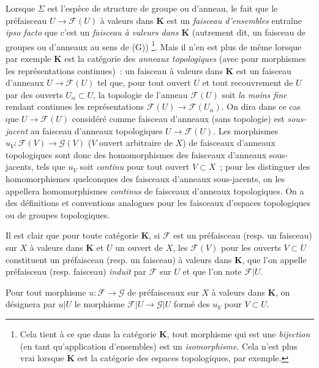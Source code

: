 \begin{env}[3.1.4]
\label{0.3.1.4-fr}
Lorsque $\Sigma$ est l'espèce de structure de groupe ou d'anneau, le fait que
le préfaisceau $U\to\mathcal{F}(U)$ à valeurs dans $\mathbf{K}$ est un
\emph{faisceau d'ensembles} entraîne \emph{ipso facto} que c'est un
\emph{faisceau à valeurs dans $\mathbf{K}$} (autrement dit, un faisceau de
groupes ou d'anneaux au sens de (G))%
\footnote{Cela tient à ce que dans la catégorie $\mathbf{K}$, tout morphisme
qui est une \emph{bijection} (en tant qu'application d'ensembles) est un
\emph{isomorphisme}. Cela n'est plus vrai lorsque $\mathbf{K}$ est la
catégorie des espaces topologiques, par exemple.}. Mais il n'en est plus de
même lorsque par exemple $\mathbf{K}$ est la catégorie des \emph{anneaux
topologiques} (avec pour morphismes les représentations continues)~: un
faisceau à valeurs dans $\mathbf{K}$ est un faisceau d'anneaux
$U\to\mathcal{F}(U)$ tel que, pour tout ouvert $U$ et tout recouvrement de $U$
par des ouverts $U_\alpha\subset U$, la topologie de l'anneau $\mathcal{F}(U)$
soit \emph{la moins fine} rendant continues les représentations
$\mathcal{F}(U)\to\mathcal{F}(U_\alpha)$. On dira dans ce cas que
$U\to\mathcal{F}(U)$ considéré comme faisceau d'anneaux (sans topologie) est
\emph{sous-jacent} au faisceau d'anneaux topologiques
$U\to\mathcal{F}(U)$. Les morphismes
$u_V:\mathcal{F}(V)\to\mathcal{G}(V)$ ($V$ ouvert arbitraire de $X$) de
faisceaux d'anneaux topologiques sont donc des homomorphismes des faisceaux
d'anneaux sous-jacents, tels que $u_V$ soit \emph{continu} pour tout ouvert
$V\subset X$~; pour les distinguer des homomorphismes quelconques des
faisceaux d'anneaux sous-jacents, on les appellera homomorphismes
\emph{continus} de faisceaux d'anneaux topologiques. On a des définitions et
conventions analogues pour les faisceaux d'espaces topologiques ou de groupes
topologiques.
\end{env}


\begin{env}[3.1.5]
\label{0.3.1.5-fr}
Il est clair que pour toute catégorie $\mathbf{K}$, si $\mathcal{F}$ est un
préfaisceau (resp. un faisceau) sur $X$ à valeurs dans $\mathbf{K}$ et $U$ un
ouvert de $X$, les $\mathcal{F}(V)$ pour les ouverts $V\subset U$ constituent
un préfaisceau (resp. un faisceau) à valeurs dans $\mathbf{K}$, que l'on
appelle préfaisceau (resp. faisceau) \emph{induit} par $\mathcal{F}$ sur $U$ et
que l'on note $\mathcal{F}|U$.

Pour tout morphisme $u:\mathcal{F}\to\mathcal{G}$ de préfaisceaux sur $X$ à
valeurs dans $\mathbf{K}$, on désignera par $u|U$ le morphisme
$\mathcal{F}|U\to\mathcal{G}|U$ formé des $u_V$ pour $V\subset U$.
\end{env}

